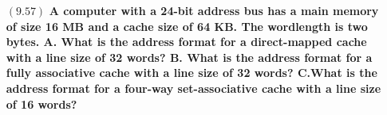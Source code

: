 \documentclass[letterpaper,10pt,titlepage]{article}
\begin{document}
\begin{enumerate}
\item[$(9.57)$] \textbf{A computer with a 24-bit address bus has a main memory of size 16 MB and a cache size of 64 KB. The wordlength is two bytes. A. What is the address format for a direct-mapped cache with a line size of 32 words? B. What is the address format for a fully associative cache with a line size of 32 words? C.What is the address format for a four-way set-associative cache with a line size of 16 words?}

\end{enumerate}
\end{document}

